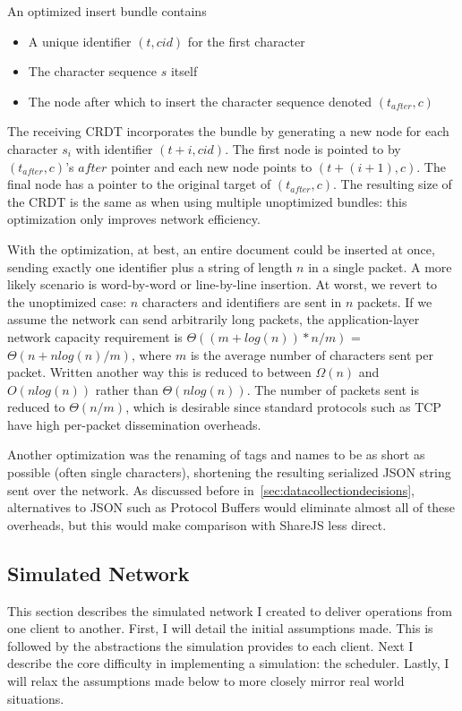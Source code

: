 \documentclass[12pt,a4paper,twoside,openright]{report}
\begin{document}
			An optimized insert bundle contains
			\begin{itemize}
				\item A unique identifier  $(t, cid)$ for the first character
				\item The character sequence $s$ itself
				\item The node after which to insert the character sequence denoted $(t_{after}, c)$
			\end{itemize}
			
			The receiving CRDT incorporates the bundle by generating a new node for each character $s_i$ with identifier $(t + i, cid)$. The first node is pointed to by $(t_{after}, c)$'s $after$ pointer and each new node points to $(t + (i+1), c)$. The final node has a pointer to the original target of $(t_{after}, c)$. The resulting size of the CRDT is the same as when using multiple unoptimized bundles: this optimization only improves network efficiency.
			
			With the optimization, at best, an entire document could be inserted at once, sending exactly one identifier plus a string of length $n$ in a single packet. A more likely scenario is word-by-word or line-by-line insertion. At worst, we revert to the unoptimized case: $n$ characters and identifiers are sent in $n$ packets. If we assume the network  can send arbitrarily long packets, the application-layer network capacity requirement is $\Theta ((m+log(n)) * n/m)$ = $\Theta (n + nlog(n)/m)$, where $m$ is the average number of characters sent per packet. Written another way this is reduced to between $\Omega (n)$ and $O(nlog(n))$ rather than $\Theta(nlog(n))$. The number of packets sent is reduced to $\Theta(n/m)$, which is desirable since standard protocols such as TCP have high per-packet dissemination overheads.
			
			Another optimization was the renaming of tags and names to be as short as possible (often single characters), shortening the resulting serialized JSON string sent over the network. As discussed before in~\cref{sec:datacollectiondecisions}, alternatives to JSON such as Protocol Buffers would eliminate almost all of these overheads, but this would make comparison with ShareJS less direct.
	
	\subsection{Simulated Network}
	
		This section describes the simulated network I created to deliver operations from one client to another. First, I will detail the initial assumptions made. This is followed by the abstractions the simulation provides to each client. Next I describe the core difficulty in implementing a simulation: the scheduler. Lastly, I will relax the assumptions made below to more closely mirror real world situations.
		
\end{document}
